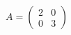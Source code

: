 \documentclass[preview]{standalone}
\begin{document}
\begin{align*}
A =  \begin{pmatrix} 2 & 0\\ 0 & 3 \end{pmatrix}
\end{align*}
\end{document}
